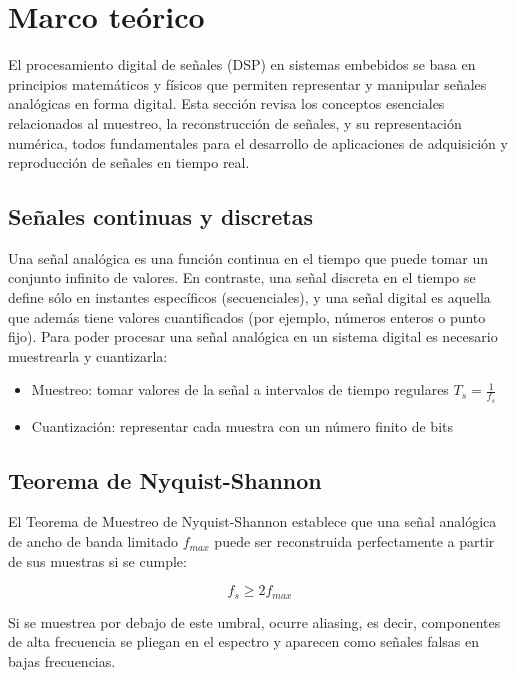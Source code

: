 \documentclass[12pt]{article}
\begin{document}
	\section{Marco teórico}
	El procesamiento digital de señales (DSP) en sistemas embebidos se basa en principios matemáticos y físicos que permiten representar y manipular señales analógicas en forma digital. Esta sección revisa los conceptos esenciales relacionados al muestreo, la reconstrucción de señales, y su representación numérica, todos fundamentales para el desarrollo de aplicaciones de adquisición y reproducción de señales en tiempo real.
	
	\subsection{Señales continuas y discretas}
	Una señal analógica es una función continua en el tiempo que puede tomar un conjunto infinito de valores. En contraste, una señal discreta en el tiempo se define sólo en instantes específicos (secuenciales), y una señal digital es aquella que además tiene valores cuantificados (por ejemplo, números enteros o punto fijo).
	Para poder procesar una señal analógica en un sistema digital es necesario muestrearla y cuantizarla:
	
	\begin{itemize}
		\item Muestreo: tomar valores de la señal a intervalos de tiempo regulares $T_{s} = \frac{1}{f_{s}}$
		\item Cuantización: representar cada muestra con un número finito de bits 
	\end{itemize}
	
	\subsection{Teorema de Nyquist-Shannon}
	El Teorema de Muestreo de Nyquist-Shannon establece que una señal analógica de ancho de banda limitado $f_{max}$ puede ser reconstruida perfectamente a partir de sus muestras si se cumple:
	
	\begin{equation}
		f_{s} \geq 2 f_{max}
	\end{equation}
	
	Si se muestrea por debajo de este umbral, ocurre aliasing, es decir, componentes de alta frecuencia se pliegan en el espectro y aparecen como señales falsas en bajas frecuencias.
	
\end{document}
